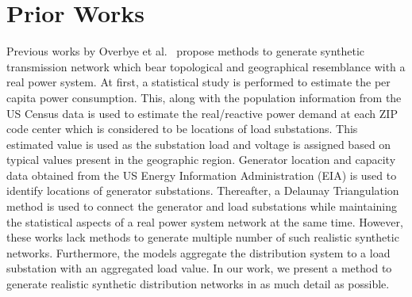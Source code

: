 \section{Prior Works}
Previous works by Overbye et al.~\cite{overbye_101,overbye_102} propose methods to generate synthetic transmission network which bear topological and geographical resemblance with a real power system. At first, a statistical study is performed to estimate the per capita power consumption. This, along with the population information from the US Census data is used to estimate the real/reactive power demand at each ZIP code center which is considered to be locations of load substations. This estimated value is used as the substation load and voltage is assigned based on typical values present in the geographic region. Generator location and capacity data obtained from the US Energy Information Administration (EIA) is used to identify locations of generator substations. Thereafter, a Delaunay Triangulation method is used to connect the generator and load substations while maintaining the statistical aspects of a real power system network at the same time. However, these works lack methods to generate multiple number of such realistic synthetic networks. Furthermore, the models aggregate the distribution system to a load substation with an aggregated load value. In our work, we present a method to generate realistic synthetic distribution networks in as much detail as possible.